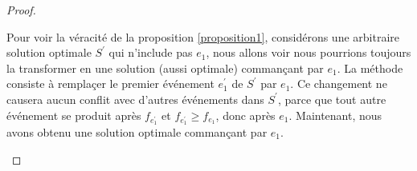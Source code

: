 \documentclass[10pt,a4paper]{article}
\begin{document}
\begin{proof}
\begin{description}
		Pour voir la véracité de la proposition \ref{proposition1}, considérons une arbitraire solution optimale $S^{'}$ qui n'include pas $e_1$, nous allons voir nous pourrions toujours la transformer en une solution (aussi optimale) commançant par $e_1$. La méthode consiste à remplaçer le premier événement $e_{1}^{'}$ de $S^{'}$ par $e_1$. Ce changement ne causera aucun conflit avec d'autres événements dans $S^{'}$, parce que tout autre événement se produit après $f_{e_1^{'}}$ et $f_{e_1^{'}} \ge f_{e_1}$, donc après $e_1$. Maintenant, nous avons obtenu une solution optimale commançant par $e_1$. 
	\end{description} 	
\end{proof}



\newpage
\end{document}
